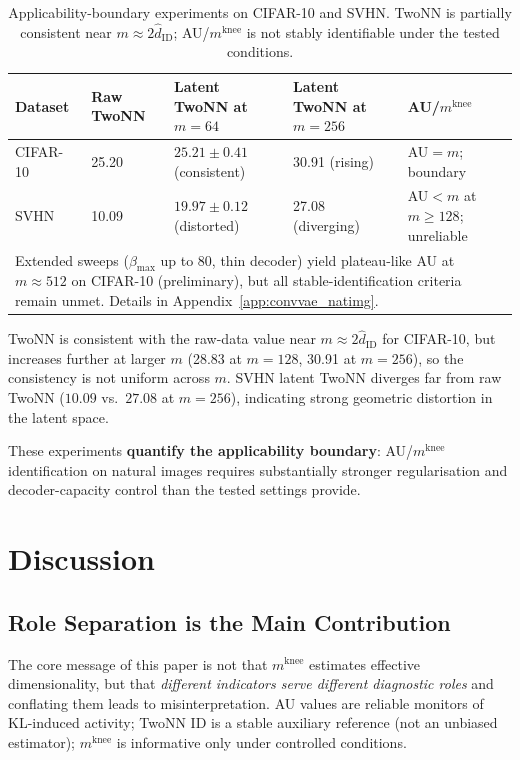 \documentclass[11pt,a4paper]{article}
\newcommand{\mknee}{m^{\mathrm{knee}}}
\newcommand{\hatdID}{\hat{d}_{\mathrm{ID}}}
\begin{document}
\begin{table}[ht]
\centering
\caption{Applicability-boundary experiments on CIFAR-10 and SVHN.
TwoNN is partially consistent near $m\approx2\hatdID$;
AU/$\mknee$ is not stably identifiable under the tested conditions.}
\label{tab:natimg_summary}
\small
\begin{tabularx}{\linewidth}{lXXXX}
\toprule
Dataset & Raw TwoNN & Latent TwoNN at $m=64$ & Latent TwoNN at $m=256$ & AU/$\mknee$ \\
\midrule
CIFAR-10 & 25.20 & $25.21\pm0.41$ (consistent) & 30.91 (rising) & AU$=m$; boundary \\
SVHN & 10.09 & $19.97\pm0.12$ (distorted) & 27.08 (diverging) & AU$<m$ at $m\geq128$; unreliable \\
\bottomrule
\multicolumn{5}{p{0.97\linewidth}}{\footnotesize
Extended sweeps ($\beta_{\max}$ up to 80, thin decoder) yield plateau-like AU
at $m\approx512$ on CIFAR-10 (preliminary), but all stable-identification
criteria remain unmet. Details in Appendix~\ref{app:convvae_natimg}.}
\end{tabularx}
\end{table}

TwoNN is consistent with the raw-data value near $m\approx2\hatdID$ for
CIFAR-10, but increases further at larger $m$ (28.83 at $m=128$, 30.91 at
$m=256$), so the consistency is not uniform across $m$.
SVHN latent TwoNN diverges far from raw TwoNN ($10.09$ vs.\ $27.08$ at
$m=256$), indicating strong geometric distortion in the latent space.

These experiments \textbf{quantify the applicability boundary}:
AU/$\mknee$ identification on natural images requires substantially stronger
regularisation and decoder-capacity control than the tested settings provide.

\section{Discussion}\label{sec:discussion}

\subsection{Role Separation is the Main Contribution}\label{sec:disc_roles}

The core message of this paper is not that $\mknee$ estimates effective
dimensionality, but that \emph{different indicators serve different diagnostic
roles} and conflating them leads to misinterpretation.
AU values are reliable monitors of KL-induced activity; TwoNN ID is a stable
auxiliary reference (not an unbiased estimator); $\mknee$ is informative only
under controlled conditions.
\end{document}
